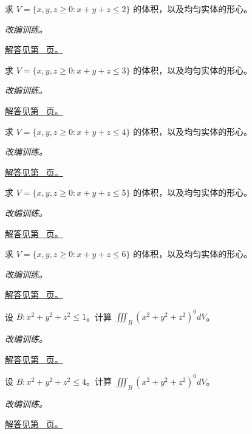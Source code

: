 \documentclass[UTF8,12pt,a4paper,fontset=fandol]{ctexart}
\begin{document}
\begin{example}[四面体体积与形心]\label{ex:c38q8}
求 $V=\{x,y,z\ge0:x+y+z\le 2\}$ 的体积，以及均匀实体的形心。
\par\textit{改编训练。}\par\hyperref[ans:c38q8]{解答见第~\pageref{ans:c38q8} 页。}
\end{example}
\begin{example}[四面体体积与形心]\label{ex:c38q9}
求 $V=\{x,y,z\ge0:x+y+z\le 3\}$ 的体积，以及均匀实体的形心。
\par\textit{改编训练。}\par\hyperref[ans:c38q9]{解答见第~\pageref{ans:c38q9} 页。}
\end{example}
\begin{example}[四面体体积与形心]\label{ex:c38q10}
求 $V=\{x,y,z\ge0:x+y+z\le 4\}$ 的体积，以及均匀实体的形心。
\par\textit{改编训练。}\par\hyperref[ans:c38q10]{解答见第~\pageref{ans:c38q10} 页。}
\end{example}
\begin{example}[四面体体积与形心]\label{ex:c38q11}
求 $V=\{x,y,z\ge0:x+y+z\le 5\}$ 的体积，以及均匀实体的形心。
\par\textit{改编训练。}\par\hyperref[ans:c38q11]{解答见第~\pageref{ans:c38q11} 页。}
\end{example}
\begin{example}[四面体体积与形心]\label{ex:c38q12}
求 $V=\{x,y,z\ge0:x+y+z\le 6\}$ 的体积，以及均匀实体的形心。
\par\textit{改编训练。}\par\hyperref[ans:c38q12]{解答见第~\pageref{ans:c38q12} 页。}
\end{example}
\begin{example}[球内的径向积分]\label{ex:c38q13}
设 $B:x^2+y^2+z^2\le 1$。计算 $\displaystyle\iiint_B(x^2+y^2+z^2)^{0}dV$。
\par\textit{改编训练。}\par\hyperref[ans:c38q13]{解答见第~\pageref{ans:c38q13} 页。}
\end{example}
\begin{example}[球内的径向积分]\label{ex:c38q14}
设 $B:x^2+y^2+z^2\le 4$。计算 $\displaystyle\iiint_B(x^2+y^2+z^2)^{0}dV$。
\par\textit{改编训练。}\par\hyperref[ans:c38q14]{解答见第~\pageref{ans:c38q14} 页。}
\end{example}
\end{document}
